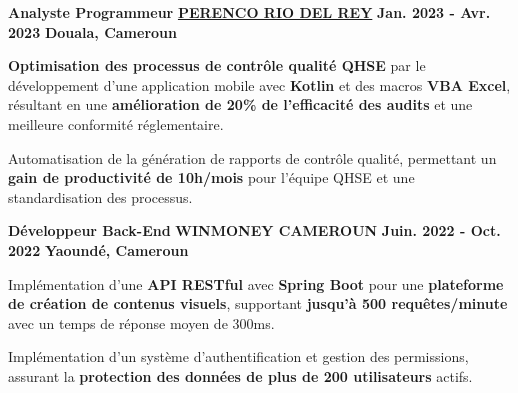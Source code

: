 \begin{cventries}
{\begin{cvitems}
      \end{cvitems}
    }
  \cventry
    {\textbf{Analyste Programmeur}} %
    {\textbf{\href{https://www.perenco.com/}{PERENCO RIO DEL REY}}} %
    {\textbf{Jan. 2023 - Avr. 2023}} %
    {\textbf{Douala, Cameroun}} %
    {
      \begin{cvitems} %
        \item {\textbf{Optimisation des processus de contrôle qualité QHSE} par le développement d'une application mobile avec \textbf{Kotlin} et des macros \textbf{VBA Excel}, résultant en une \textbf{amélioration de 20\% de l'efficacité des audits} et une meilleure conformité réglementaire.}
        \item {Automatisation de la génération de rapports de contrôle qualité, permettant un \textbf{gain de productivité de 10h/mois} pour l'équipe QHSE et une standardisation des processus.}
      \end{cvitems}
    }
  \cventry
    {\textbf{Développeur Back-End}} %
    {\textbf{WINMONEY CAMEROUN}} %
    {\textbf{Juin. 2022 - Oct. 2022}} %
    {\textbf{Yaoundé, Cameroun}} %
    {
      \begin{cvitems} %
        \item {Implémentation d'une \textbf{API RESTful} avec \textbf{Spring Boot} pour une \textbf{plateforme de création de contenus visuels}, supportant \textbf{jusqu'à 500 requêtes/minute} avec un temps de réponse moyen de 300ms.}
        \item {Implémentation d'un système d'authentification et gestion des permissions, assurant la \textbf{protection des données de plus de 200 utilisateurs} actifs.}
      \end{cvitems}
    }
\end{cventries}